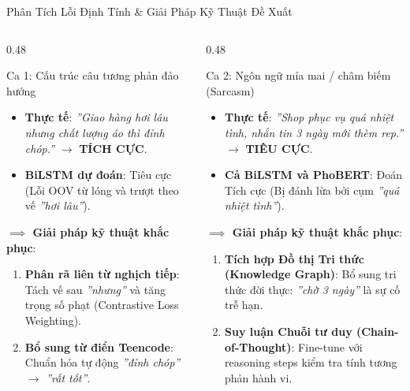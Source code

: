 \documentclass[aspectratio=169, 10pt]{beamer}
\begin{document}
\begin{frame}{Phân Tích Lỗi Định Tính \& Giải Pháp Kỹ Thuật Đề Xuất}
  \begin{columns}[T, onlytextwidth]
    \begin{column}{0.48\textwidth}
      \begin{block}{Ca 1: Cấu trúc câu tương phản đảo hướng}
        \fontsize{7.5}{9.5}\selectfont
        \begin{itemize}\setlength{\itemsep}{0.15em}
          \item \textbf{Thực tế}: \textit{''Giao hàng hơi lâu nhưng chất lượng áo thì đỉnh chóp.''} $\to$ \textbf{TÍCH CỰC}.
          \item \textbf{BiLSTM dự đoán}: Tiêu cực (Lỗi OOV từ lóng và trượt theo vế \textit{''hơi lâu''}).
        \end{itemize}
        \vspace{0.08cm}
        \textbf{\color{HCMUEDarkBlue}$\implies$ Giải pháp kỹ thuật khắc phục}:
        \begin{enumerate}\fontsize{7}{8.5}\selectfont\setlength{\itemsep}{0.1em}
          \item \textbf{Phân rã liên từ nghịch tiếp}: Tách vế sau \textit{''nhưng''} và tăng trọng số phạt (Contrastive Loss Weighting).
          \item \textbf{Bổ sung từ điển Teencode}: Chuẩn hóa tự động \textit{''đỉnh chóp''} $\to$ \textit{''rất tốt''}.
        \end{enumerate}
      \end{block}
    \end{column}
    \hfill
    \begin{column}{0.48\textwidth}
      \begin{alertblock}{Ca 2: Ngôn ngữ mỉa mai / châm biếm (Sarcasm)}
        \fontsize{7.5}{9.5}\selectfont
        \begin{itemize}\setlength{\itemsep}{0.15em}
          \item \textbf{Thực tế}: \textit{''Shop phục vụ quá nhiệt tình, nhắn tin 3 ngày mới thèm rep.''} $\to$ \textbf{TIÊU CỰC}.
          \item \textbf{Cả BiLSTM và PhoBERT}: Đoán Tích cực (Bị đánh lừa bởi cụm \textit{''quá nhiệt tình''}).
        \end{itemize}
        \vspace{0.08cm}
        \textbf{\color{HCMUERed}$\implies$ Giải pháp kỹ thuật khắc phục}:
        \begin{enumerate}\fontsize{7}{8.5}\selectfont\setlength{\itemsep}{0.1em}
          \item \textbf{Tích hợp Đồ thị Tri thức (Knowledge Graph)}: Bổ sung tri thức đời thực: \textit{''chờ 3 ngày''} là sự cố trễ hạn.
          \item \textbf{Suy luận Chuỗi tư duy (Chain-of-Thought)}: Fine-tune với reasoning steps kiểm tra tính tương phản hành vi.
        \end{enumerate}
      \end{alertblock}
    \end{column}
  \end{columns}
\end{frame}
\end{document}
